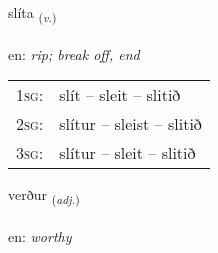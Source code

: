 \documentclass[frontgrid, backgrid]{flacards}\usepackage[]{graphicx}\usepackage[]{color}
\begin{document}
\renewcommand{\flhead}{\vskip5pt \fboxsep=0pt {\small\bfseries\footnotesize Sagnorð | Verb}}
\renewcommand{\fcfoot}{\vskip5pt \fboxsep=0pt \hspace{2pt}{\small\bfseries\footnotesize 2K}}

\renewcommand{\blhead}{\vskip5pt {\small\bfseries\footnotesize Sagnorð | Verb }}
\renewcommand{\bcfoot}{\vskip5pt \hspace{2pt}{\small\bfseries\footnotesize 2K}}


{slíta \small{\textsubscript{(\textit{v.})}} \\[1ex] %
\textphonetic{[stliːta]} \\
en: \emph{rip; break off, end} \\  [2ex]
\renewcommand*{\arraystretch}{0.8}
\begin{tabular}{p{1cm}l}
\textsc{1sg}: & slít -- sleit -- slitið \\ 
\textsc{2sg}: & slítur -- sleist -- slitið \\ 
\textsc{3sg}: & slítur -- sleit -- slitið \\ 
\end{tabular}
}

\renewcommand{\flhead}{\vskip5pt \fboxsep=0pt {\small\bfseries\footnotesize Lýsingarorð | Adjective}}
\renewcommand{\fcfoot}{\vskip5pt \fboxsep=0pt \hspace{2pt}{\small\bfseries\footnotesize 2K}}

\renewcommand{\blhead}{\vskip5pt {\small\bfseries\footnotesize Lýsingarorð | Adjective }}
\renewcommand{\bcfoot}{\vskip5pt \hspace{2pt}{\small\bfseries\footnotesize 2K}}


{verður \small{\textsubscript{(\textit{adj.})}} \\[1ex] %
\textphonetic{[vɛrðʏr]} \\
en: \emph{worthy} \\  [2ex]
\renewcommand*{\arraystretch}{0.8}
}
\end{document}
